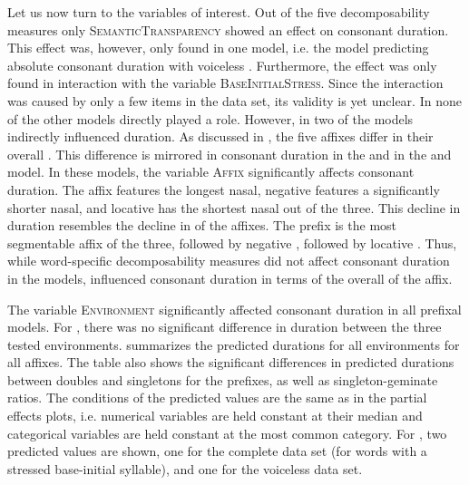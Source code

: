 Let us now turn to the variables of interest. Out of the five decomposability measures only \textsc{SemanticTransparency} showed an effect on consonant duration. This effect was, however, only found in one model, i.e. the model predicting absolute consonant duration with voiceless .  Furthermore, the effect was only found in interaction with the variable \textsc{BaseInitialStress}. Since the interaction was caused by only a few items in the data set, its validity is yet unclear. 
In none of the other models  directly played a role. 
However, in two of the models  indirectly influenced duration. As discussed in , the five affixes differ in their overall . This difference is mirrored in consonant duration in the  and in the  and  model. In these models, the variable \textsc{Affix} significantly affects consonant duration. The affix  features the longest nasal, negative  features a significantly shorter nasal, and locative  has the shortest nasal out of the three. This decline in duration resembles the decline in  of the affixes. The prefix  is the most segmentable affix of the three, followed by negative , followed by locative . Thus, while word-specific decomposability measures did not affect consonant duration in the models,  influenced consonant duration in terms of the overall  of the affix.


The variable \textsc{Environment} significantly affected consonant duration in all prefixal models. For , there was no significant difference in duration between the three tested environments.
 summarizes the predicted durations for all environments for all affixes. The table also shows the significant differences in predicted durations between doubles and singletons for the prefixes, as well as singleton-geminate ratios.
The conditions of the predicted values are the same as in the partial effects plots, i.e. numerical variables are held constant at their median and categorical variables are held constant at the most common category. For , two predicted values are shown, one for the complete data set (for words with a stressed base-initial syllable), and one for the voiceless data set.







